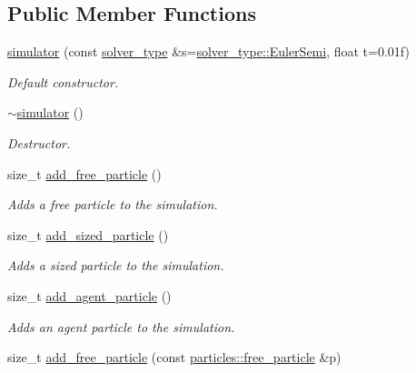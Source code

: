 \subsection*{Public Member Functions}
\begin{DoxyCompactItemize}
\item 
\hyperlink{classphysim_1_1simulator_ae89aeb2287bbf9bbb482f448e2ac375a}{simulator} (const \hyperlink{namespacephysim_a09adeda29c09e651877e880d31fc9686}{solver\+\_\+type} \&s=\hyperlink{namespacephysim_a09adeda29c09e651877e880d31fc9686a1855dee0fffde2f4ed8ef6c4a0420b30}{solver\+\_\+type\+::\+Euler\+Semi}, float t=0.\+01f)
\begin{DoxyCompactList}\small\item\em Default constructor. \end{DoxyCompactList}\item 
\mbox{\label{classphysim_1_1simulator_af4b2f525e544e0b642683d2260bb9c1a}} 
\hyperlink{classphysim_1_1simulator_af4b2f525e544e0b642683d2260bb9c1a}{$\sim$simulator} ()
\begin{DoxyCompactList}\small\item\em Destructor. \end{DoxyCompactList}\item 
size\+\_\+t \hyperlink{classphysim_1_1simulator_a6d2b636673f895b006724a6ba310e322}{add\+\_\+free\+\_\+particle} ()
\begin{DoxyCompactList}\small\item\em Adds a free particle to the simulation. \end{DoxyCompactList}\item 
size\+\_\+t \hyperlink{classphysim_1_1simulator_ae36d99f98f5e470934eea0523ffca583}{add\+\_\+sized\+\_\+particle} ()
\begin{DoxyCompactList}\small\item\em Adds a sized particle to the simulation. \end{DoxyCompactList}\item 
size\+\_\+t \hyperlink{classphysim_1_1simulator_ae8d53411a8f972962e60e46980b7766d}{add\+\_\+agent\+\_\+particle} ()
\begin{DoxyCompactList}\small\item\em Adds an agent particle to the simulation. \end{DoxyCompactList}\item 
size\+\_\+t \hyperlink{classphysim_1_1simulator_adc50e1ec0da019bf120db3ae5af27d39}{add\+\_\+free\+\_\+particle} (const \hyperlink{classphysim_1_1particles_1_1free__particle}{particles\+::free\+\_\+particle} \&p)

\end{DoxyCompactItemize}
